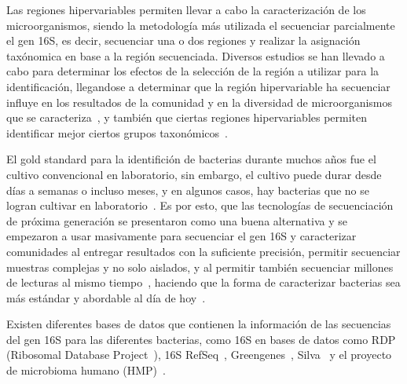 Las regiones hipervariables permiten llevar a cabo la caracterización de los microorganismos, siendo la metodología más utilizada el secuenciar parcialmente el gen 16S, es decir, secuenciar una o dos regiones y realizar la asignación taxónomica en base a la región secuenciada. Diversos estudios se han llevado a cabo para determinar los efectos de la selección de la región a utilizar para la identificación, llegandose a determinar que la región hipervariable ha secuenciar influye en los resultados de la comunidad y en la diversidad de microorganismos que se caracteriza~\cite{klindworth2013evaluation,mizrahi2013taxonomic,guo2013taxonomic,soergel2012selection}, y también que ciertas regiones hipervariables permiten identificar mejor ciertos grupos taxonómicos~\cite{buscar}.




El gold standard para la identifición de bacterias durante muchos años fue el cultivo convencional en laboratorio, sin embargo, el cultivo puede durar desde días a semanas o incluso meses, y en algunos casos, hay bacterias que no se logran cultivar en laboratorio~\cite{didelot2012transforming}. Es por esto, que las tecnologías de secuenciación de próxima generación se presentaron como una buena alternativa y se empezaron a usar masivamente para secuenciar el gen 16S y caracterizar comunidades al entregar resultados con la suficiente precisión, permitir secuenciar muestras complejas y no solo aislados, y al permitir también secuenciar millones de lecturas al mismo tiempo~\cite{reller2007detection}, haciendo que la forma de caracterizar bacterias sea más estándar y abordable al día de hoy~\cite{woo2008then, tanner1994impact}. 

Existen diferentes bases de datos que contienen la información de las secuencias del gen 16S para las diferentes bacterias, como 16S en bases de datos como RDP (Ribosomal Database Project~\cite{cole2014ribosomal}), 16S RefSeq~\cite{}, Greengenes~\cite{desantis2006greengenes}, Silva~\cite{} y el proyecto de microbioma humano (HMP)~\cite{}.
